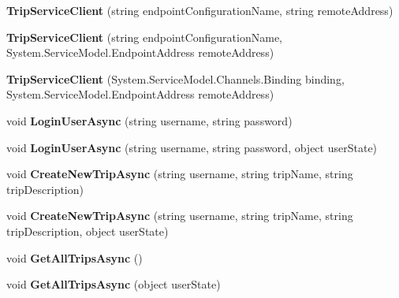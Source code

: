 \begin{DoxyCompactItemize}
\item 
\hypertarget{class_trip_service_client_ab4a2663da378c9b53d77ae14cb527579}{
{\bfseries TripServiceClient} (string endpointConfigurationName, string remoteAddress)}
\label{class_trip_service_client_ab4a2663da378c9b53d77ae14cb527579}

\item 
\hypertarget{class_trip_service_client_a14810eca7652c4f20b773d6f6ee80b4b}{
{\bfseries TripServiceClient} (string endpointConfigurationName, System.ServiceModel.EndpointAddress remoteAddress)}
\label{class_trip_service_client_a14810eca7652c4f20b773d6f6ee80b4b}

\item 
\hypertarget{class_trip_service_client_a74f3aec249adc60fef595b722d37599c}{
{\bfseries TripServiceClient} (System.ServiceModel.Channels.Binding binding, System.ServiceModel.EndpointAddress remoteAddress)}
\label{class_trip_service_client_a74f3aec249adc60fef595b722d37599c}

\item 
\hypertarget{class_trip_service_client_a5647c3d8d6c56a8391e1c6a08e52b8bf}{
void {\bfseries LoginUserAsync} (string username, string password)}
\label{class_trip_service_client_a5647c3d8d6c56a8391e1c6a08e52b8bf}

\item 
\hypertarget{class_trip_service_client_ae42142a56684ab94bfdd62504067eaa2}{
void {\bfseries LoginUserAsync} (string username, string password, object userState)}
\label{class_trip_service_client_ae42142a56684ab94bfdd62504067eaa2}

\item 
\hypertarget{class_trip_service_client_ad066d796a79b884da4809c6895205709}{
void {\bfseries CreateNewTripAsync} (string username, string tripName, string tripDescription)}
\label{class_trip_service_client_ad066d796a79b884da4809c6895205709}

\item 
\hypertarget{class_trip_service_client_a826bd31109eded9a545c98aaa2e787e5}{
void {\bfseries CreateNewTripAsync} (string username, string tripName, string tripDescription, object userState)}
\label{class_trip_service_client_a826bd31109eded9a545c98aaa2e787e5}

\item 
\hypertarget{class_trip_service_client_a1de733221c694d0e53a037a6028876c6}{
void {\bfseries GetAllTripsAsync} ()}
\label{class_trip_service_client_a1de733221c694d0e53a037a6028876c6}

\item 
\hypertarget{class_trip_service_client_ae2d292280d0bc4223e10324a044f057a}{
void {\bfseries GetAllTripsAsync} (object userState)}
\label{class_trip_service_client_ae2d292280d0bc4223e10324a044f057a}


\end{DoxyCompactItemize}
